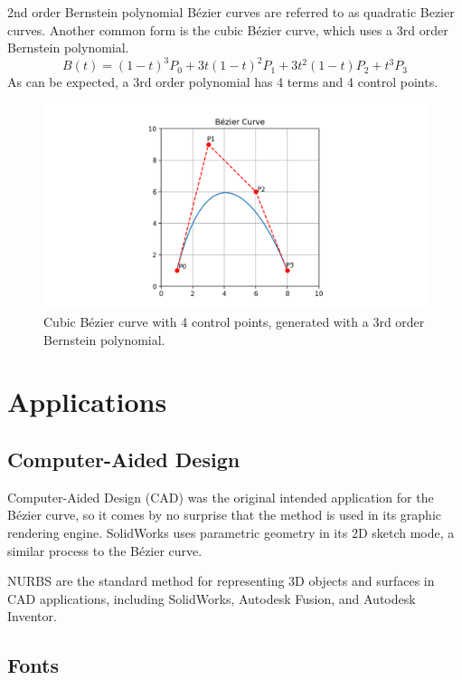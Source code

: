 \documentclass[12pt,letterpaper]{article}
\begin{document}
2nd order Bernstein polynomial B\'ezier curves are referred to as quadratic Bezier curves. Another common form is the cubic B\'ezier curve, which uses a 3rd order Bernstein polynomial.
$$B(t)=(1-t)^3 P_0+3t (1-t)^2 P_1+3t^2 (1-t) P_2+t^3 P_3$$
As can be expected, a 3rd order polynomial has 4 terms and 4 control points.

\begin{figure}[H]
\centering
\includegraphics[width=15cm]{Figure_5}
\caption{Cubic B\'ezier curve with 4 control points, generated with a 3rd order Bernstein polynomial.}
\end{figure}

\section{Applications}

\subsection{Computer-Aided Design}

Computer-Aided Design (CAD) was the original intended application for the B\'ezier curve, so it comes by no surprise that the method is used in its graphic rendering engine. SolidWorks uses parametric geometry in its 2D sketch mode, a similar process to the B\'ezier curve. 


NURBS are the standard method for representing 3D objects and surfaces in CAD applications, including SolidWorks, Autodesk Fusion, and Autodesk Inventor. 

\subsection{Fonts}
\end{document}
